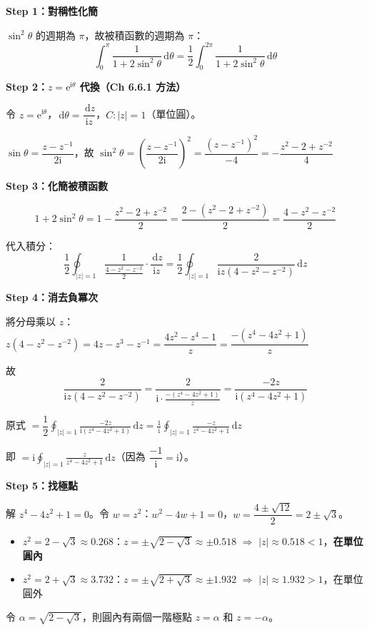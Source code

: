 \documentclass[12pt,a4paper]{article}
\newcommand{\dd}{\,\mathrm{d}}
\newcommand{\ii}{\mathrm{i}}
\newcommand{\ee}{\mathrm{e}}
\begin{document}
\begin{solbox}[解]
\textbf{Step 1：對稱性化簡}

$\sin^2\theta$ 的週期為 $\pi$，故被積函數的週期為 $\pi$：
$$\int_0^{\pi}\frac{1}{1+2\sin^2\theta}\dd{\theta}=\frac{1}{2}\int_0^{2\pi}\frac{1}{1+2\sin^2\theta}\dd{\theta}$$

\textbf{Step 2：$z=\ee^{\ii\theta}$ 代換（Ch 6.6.1 方法）}

令 $z=\ee^{\ii\theta}$，$\dd{\theta}=\dfrac{\dd{z}}{\ii z}$，$C:|z|=1$（單位圓）。

$\sin\theta=\dfrac{z-z^{-1}}{2\ii}$，故 $\sin^2\theta=\left(\dfrac{z-z^{-1}}{2\ii}\right)^2=\dfrac{(z-z^{-1})^2}{-4}=-\dfrac{z^2-2+z^{-2}}{4}$

\textbf{Step 3：化簡被積函數}

$$1+2\sin^2\theta=1-\frac{z^2-2+z^{-2}}{2}=\frac{2-(z^2-2+z^{-2})}{2}=\frac{4-z^2-z^{-2}}{2}$$

代入積分：
$$\frac{1}{2}\oint_{|z|=1}\frac{1}{\frac{4-z^2-z^{-2}}{2}}\cdot\frac{\dd{z}}{\ii z}=\frac{1}{2}\oint_{|z|=1}\frac{2}{\ii z(4-z^2-z^{-2})}\dd{z}$$

\textbf{Step 4：消去負冪次}

將分母乘以 $z$：$z(4-z^2-z^{-2})=4z-z^3-z^{-1}=\dfrac{4z^2-z^4-1}{z}=\dfrac{-(z^4-4z^2+1)}{z}$

故
$$\frac{2}{\ii z(4-z^2-z^{-2})}=\frac{2}{\ii\cdot\frac{-(z^4-4z^2+1)}{z}}=\frac{-2z}{\ii(z^4-4z^2+1)}$$

原式 $=\dfrac{1}{2}\displaystyle\oint_{|z|=1}\frac{-2z}{\ii(z^4-4z^2+1)}\dd{z}=\frac{1}{\ii}\oint_{|z|=1}\frac{-z}{z^4-4z^2+1}\dd{z}$

即 $=\ii\displaystyle\oint_{|z|=1}\frac{z}{z^4-4z^2+1}\dd{z}$（因為 $\dfrac{-1}{\ii}=\ii$）。

\textbf{Step 5：找極點}

解 $z^4-4z^2+1=0$。令 $w=z^2$：$w^2-4w+1=0$，$w=\dfrac{4\pm\sqrt{12}}{2}=2\pm\sqrt{3}$。

\begin{itemize}
\item $z^2=2-\sqrt{3}\approx 0.268$：$z=\pm\sqrt{2-\sqrt{3}}\approx\pm 0.518$ $\Rightarrow$ $|z|\approx 0.518<1$，\textbf{在單位圓內}
\item $z^2=2+\sqrt{3}\approx 3.732$：$z=\pm\sqrt{2+\sqrt{3}}\approx\pm 1.932$ $\Rightarrow$ $|z|\approx 1.932>1$，在單位圓外
\end{itemize}

令 $\alpha=\sqrt{2-\sqrt{3}}$，則圓內有兩個一階極點 $z=\alpha$ 和 $z=-\alpha$。


\end{solbox}
\end{document}
